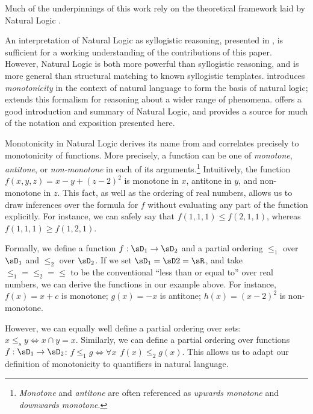 Much of the underpinnings of this work rely on the theoretical framework
  laid by Natural Logic
  \cite{key:1986benthem-natlog,key:1991valencia-natlog}.

An interpretation of Natural Logic as syllogistic reasoning,
  presented in , is sufficient
  for a working understanding of the contributions of this paper.
However, Natural Logic is both more powerful than syllogistic reasoning,
  and is more general than structural matching to known
  syllogistic templates.
 introduces \textit{monotonicity} in the context
  of natural language to form the basis of natural logic;
   extends this formalism for reasoning about
  a wider range of phenomena.
 offers a good introduction and summary of
  Natural Logic, and provides a source for much of the notation and
  exposition presented here.


Monotonicity in Natural Logic derives its name from and correlates
  precisely to monotonicity of functions.
More precisely, a function can be one of \textit{monotone},
  \textit{antitone}, or \textit{non-monotone} in each of its
  arguments.\footnote{
    \textit{Monotone} and \textit{antitone} are often referenced
    as \textit{upwards monotone} and \textit{downwards monotone}.
  }
Intuitively, the function $f(x,y,z) = x - y + (z-2)^2$ is
  monotone in $x$, antitone in $y$, and non-monotone in $z$.
This fact, as well as the ordering of real numbers, allows us to
  draw inferences over the formula for $f$ without evaluating
  any part of the function explicitly.
For instance, we can safely say that $f(1,1,1) \leq f(2,1,1)$, whereas
  $f(1,1,1) \geq f(1,2,1)$.

Formally, we define a function $f:\sD_1 \rightarrow \sD_2$ and a partial
  ordering $\le_1$ over $\sD_1$ and $\le_2$ over $\sD_2$.
If we set $\sD_1 = \sD2 = \sR$, and take $\le_1 = \le_2 = \le$ to be
  the conventional ``less than or equal to'' over real numbers,
  we can derive the functions in our example above.
For instance, $f(x) = x + c$ is monotone; $g(x) = -x$ is antitone;
  $h(x) = (x-2)^2$ is non-monotone.

However, we can equally well define a partial ordering over sets:
  $x \le_s y \Leftrightarrow x \cap y = x$.
Similarly, we can define a partial ordering over functions
  $f : \sD_1 \rightarrow \sD_2$:
  $f \le_1 g \Leftrightarrow \forall x ~~ f(x) \leq_2 g(x)$.
This allows us to adapt our definition of monotonicity to quantifiers
  in natural language.

